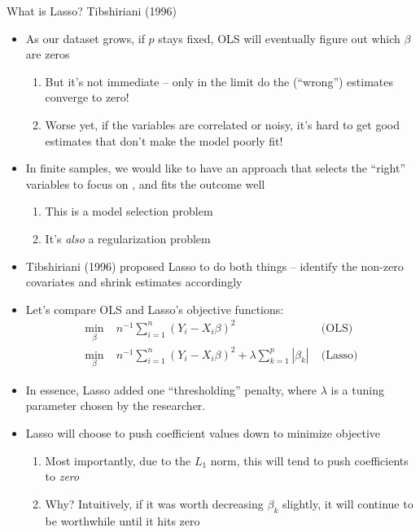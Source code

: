 \begin{frame}[allowframebreaks]{What is Lasso? Tibshiriani (1996)}
      \framebreak

        \begin{itemize}    
        \item As our dataset grows, if $p$ stays fixed, OLS will eventually
          figure out which $\beta$ are zeros
          \begin{enumerate}[-]
          \item But it's not immediate -- only in the limit do the
            (``wrong'') estimates converge to zero!
          \item Worse yet, if the variables are correlated or noisy, it's
            hard to get good estimates that don't make the model poorly fit!
          \end{enumerate}
        \item In finite samples, we would like to have an approach that
          selects the ``right'' variables to focus on , and fits the outcome well
          \begin{enumerate}[-]
          \item This is a model selection problem
          \item It's \emph{also} a regularization problem
          \end{enumerate}
        \end{itemize}
    
          \framebreak
    
        \begin{itemize}
        \item Tibshiriani (1996) proposed Lasso to do both things -- identify the
          non-zero covariates and shrink estimates accordingly
        \item Let's compare OLS and Lasso's objective functions:
              \begin{align*}
            \min_{\beta} \; & n^{-1}\sum_{i=1}^{n}(Y_{i} - X_{i}\beta)^{2}   \;& \text{(OLS)}\\
            \min_{\beta} \;& n^{-1}\sum_{i=1}^{n}(Y_{i} - X_{i}\beta)^{2} + \lambda \sum_{k=1}^{p}|\beta_{k}|   \;& \text{(Lasso)}     \end{align*}
        \item In essence, Lasso added one ``thresholding'' penalty, where
          $\lambda$ is a tuning parameter chosen by the researcher.
        \item Lasso will choose to push coefficient values down to minimize objective 
          \begin{enumerate}[-]
          \item Most importantly, due to the $L_{1}$ norm, this will tend to push coefficients to \emph{zero}
          \item Why? Intuitively, if it was worth decreasing $\beta_{k}$
            slightly, it will continue to be worthwhile until it hits zero
          \end{enumerate}
        \end{itemize}
      \end{frame}

